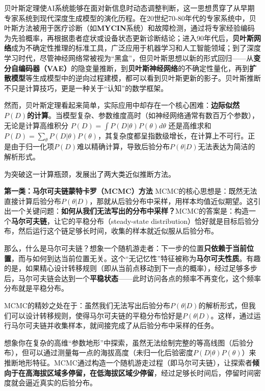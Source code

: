贝叶斯定理使AI系统能够在面对新信息时动态调整判断，这一思想贯穿了从早期专家系统到现代深度生成模型的演化历程。在20世纪70-80年代的专家系统中，贝叶斯方法被用于医疗诊断（如\textbf{MYCIN}系统）和故障检测，通过将专家经验编码为先验概率，再根据患者症状或设备状态更新诊断结论；进入90年代后，\textbf{贝叶斯网络}成为不确定性推理的标准工具，广泛应用于机器学习和人工智能领域；到了深度学习时代，尽管神经网络常被视为``黑盒''，但贝叶斯思想以新的形式回归——从\textbf{变分自编码器（VAE）}的隐变量推断，到\textbf{贝叶斯神经网络}的不确定性量化，再到\textbf{扩散模型}等生成模型中的逆向过程建模，都可以看到贝叶斯更新的影子。贝叶斯推断不只是计算技巧，更是一种关于``认知''的数学框架。

然而，贝叶斯定理看起来简单，实际应用中却存在一个核心困难：\textbf{边际似然$P(D)$的计算}。当模型复杂、参数维度高时（如神经网络通常有数百万个参数），无论是计算高维积分 $P(D) = \int P(D|\theta)P(\theta)d\theta$ 还是高维求和 $P(D) = \sum_{\theta} P(D|\theta)P(\theta)$，其复杂度都呈指数级增长，在计算上不可行。正是由于归一化项$P(D)$难以精确计算，导致后验分布$P(\theta|D)$无法表达为简洁的解析形式。

为突破这一计算瓶颈，发展出了两大类近似推断方法。

\textbf{第一类：马尔可夫链蒙特卡罗（MCMC）方法} MCMC的核心思想是：既然无法直接计算后验分布$P(\theta|D)$，那就从后验分布中采样，用样本均值近似期望。这引出一个关键问题：\textbf{如何从我们无法写出的分布中采样？}MCMC的答案是：构造一个\textbf{马尔可夫链}，让它的平稳分布（steady-state distribution）恰好就是目标后验分布，然后运行这个链足够长时间，收集的样本就近似服从后验分布。

那么，什么是马尔可夫链？想象一个随机游走者：下一步的位置\textbf{只依赖于当前位置}，而与如何到达当前位置无关。这个``无记忆性''特征被称为\textbf{马尔可夫性质}。有趣的是，如果精心设计转移规则（即从当前点移动到下一点的概率），经过足够多步后，马尔可夫链会达到一个\textbf{平稳状态}——此时访问各点的频率不再变化，这个频率分布就是平稳分布。

MCMC的精妙之处在于：虽然我们无法写出后验分布$P(\theta|D)$的解析形式，但我们可以设计转移规则，使得马尔可夫链的平稳分布恰好是$P(\theta|D)$。这样，通过运行马尔可夫链并收集样本，就间接完成了从后验分布中采样的任务。

想象你在复杂的高维``参数地形''中探索，虽然无法绘制完整的等高线图（后验分布），但可以通过测量每一点的海拔高度（未归一化后验密度$P(D|\theta)P(\theta)$）来推断地形特征。MCMC通过构造一个随机游走过程（即马尔可夫链），让探索者\textbf{倾向于在高海拔区域多停留，在低海拔区域少停留}，经过足够长时间后，停留时间密度就会逼近真实的后验分布。

